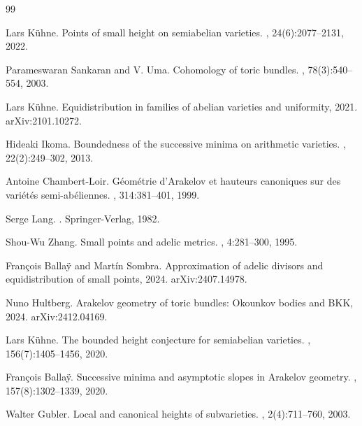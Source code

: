 \documentclass[10pt,a4paper]{amsart}
\theoremstyle{plain}
\theoremstyle{plain}
\numberwithin{equation}{section}
\begin{document}
	
	\begin{thebibliography}{99}
		
		Lars K{\"u}hne.
		\newblock Points of small height on semiabelian varieties.
		, 24(6):2077--2131, 2022.
		
		Parameswaran Sankaran and V. Uma.
		\newblock Cohomology of toric bundles.
		, 78(3):540--554, 2003.
		
		Lars K{\"u}hne.
		\newblock Equidistribution in families of abelian varieties and uniformity, 2021.
		\newblock arXiv:2101.10272.
		
		Hideaki Ikoma.
		\newblock Boundedness of the successive minima on arithmetic varieties.
		, 22(2):249--302, 2013.
		
		Antoine Chambert-Loir.
		\newblock G\'eom\'etrie d'Arakelov et hauteurs canoniques sur des vari\'et\'es semi-ab\'eliennes.
		, 314:381--401, 1999.
		
		Serge Lang.
		.
		\newblock Springer-Verlag, 1982.
		
		Shou-Wu Zhang.
		\newblock Small points and adelic metrics.
		, 4:281--300, 1995.
		
		Fran{\c c}ois Balla{\"y} and Mart\'in Sombra.
		\newblock Approximation of adelic divisors and equidistribution of small points, 2024.
		\newblock arXiv:2407.14978.
		
		Nuno Hultberg.
		\newblock Arakelov geometry of toric bundles: Okounkov bodies and BKK, 2024.
		\newblock arXiv:2412.04169.
		
		Lars K{\"u}hne.
		\newblock The bounded height conjecture for semiabelian varieties.
		, 156(7):1405--1456, 2020.
		
		Fran{\c c}ois Balla{\"y}.
		\newblock Successive minima and asymptotic slopes in Arakelov geometry.
		, 157(8):1302--1339, 2020.
		
		Walter Gubler.
		\newblock Local and canonical heights of subvarieties.
		, 2(4):711--760, 2003.
		

\end{thebibliography}
\end{document}

